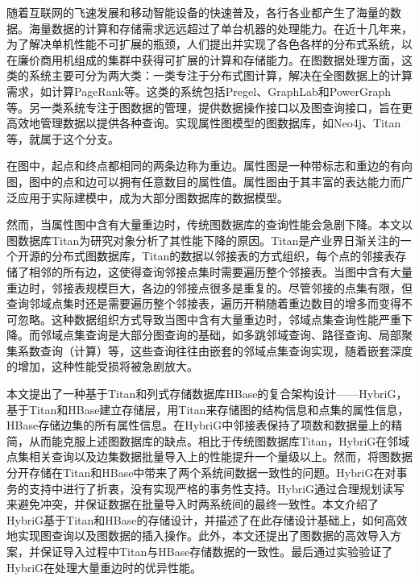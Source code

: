 
\begin{cabstract}
随着互联网的飞速发展和移动智能设备的快速普及，各行各业都产生了海量的数据。海量数据的计算和存储需求远远超过了单台机器的处理能力。在近十几年来，为了解决单机性能不可扩展的瓶颈，人们提出并实现了各色各样的分布式系统，以在廉价商用机组成的集群中获得可扩展的计算和存储能力。在图数据处理方面，这类的系统主要可分为两大类：一类专注于分布式图计算，解决在全图数据上的计算需求，如计算PageRank等。这类的系统包括Pregel、GraphLab和PowerGraph等。另一类系统专注于图数据的管理，提供数据操作接口以及图查询接口，旨在更高效地管理数据以提供各种查询。实现属性图模型的图数据库，如Neo4j、Titan等，就属于这个分支。

在图中，起点和终点都相同的两条边称为重边。属性图是一种带标志和重边的有向图，图中的点和边可以拥有任意数目的属性值。属性图由于其丰富的表达能力而广泛应用于实际建模中，成为大部分图数据库的数据模型。

然而，当属性图中含有大量重边时，传统图数据库的查询性能会急剧下降。本文以图数据库Titan为研究对象分析了其性能下降的原因。Titan是产业界日渐关注的一个开源的分布式图数据库，Titan的数据以邻接表的方式组织，每个点的邻接表存储了相邻的所有边，这使得查询邻接点集时需要遍历整个邻接表。当图中含有大量重边时，邻接表规模巨大，各边的邻接点很多是重复的。尽管邻接的点集有限，但查询邻域点集时还是需要遍历整个邻接表，遍历开稍随着重边数目的增多而变得不可忽略。这种数据组织方式导致当图中含有大量重边时，邻域点集查询性能严重下降。而邻域点集查询是大部分图查询的基础，如多跳邻域查询、路径查询、局部聚集系数查询（计算）等，这些查询往往由嵌套的邻域点集查询实现，随着嵌套深度的增加，这种性能受损将被急剧放大。

本文提出了一种基于Titan和列式存储数据库HBase的复合架构设计——HybriG，基于Titan和HBase建立存储层，用Titan来存储图的结构信息和点集的属性信息，HBase存储边集的所有属性信息。在HybriG中邻接表保持了项数和数据量上的精简，从而能克服上述图数据库的缺点。相比于传统图数据库Titan，HybriG在邻域点集相关查询以及边集数据批量导入上的性能提升一个量级以上。然而，将图数据分开存储在Titan和HBase中带来了两个系统间数据一致性的问题。HybriG在对事务的支持中进行了折衷，没有实现严格的事务性支持。HybriG通过合理规划读写来避免冲突，并保证数据在批量导入时两系统间的最终一致性。本文介绍了HybriG基于Titan和HBase的存储设计，并描述了在此存储设计基础上，如何高效地实现图查询以及图数据的插入操作。此外，本文还提出了图数据的高效导入方案，并保证导入过程中Titan与HBase存储数据的一致性。最后通过实验验证了HybriG在处理大量重边时的优异性能。

\end{cabstract}

